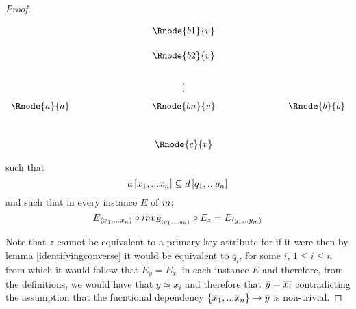 \begin{proof}
\setlength{\arraycolsep}{.2cm}
\begin{center}
$
\begin{array}{cp{2cm}ccp{2cm}c}
             & &         & \Rnode{b1}{v} &&              \\ [0.5cm]
						 & &         & \Rnode{b2}{v} &&              \\ [0.6cm]
						 & &         &    \vdots     &&              \\ [0.2cm]
\Rnode{a}{a} & &         & \Rnode{bn}{v} && \Rnode{b}{b} \\ [1.0cm]
             & &         & \Rnode{c}{v}  &&              \\
\end{array}
$
\end{center}
such that
\begin{equation}
\label{inclusiondependency}
a\left[x_1,...x_n\right]\subseteq d\left[q_1,...q_n\right]
\end{equation}
and such that in every instance $E$ of ${m}$:
\begin{equation}
\label{representationByIdentifyingRelationships}
E_{\langle x_1,...x_n \rangle}\circ inv_{E_{\langle q_1,...q_n\rangle}} \circ E_{z} = E_{\langle y_1,..y_m \rangle} 
\end{equation}

Note that $z$ cannot be equivalent to a primary key attribute for if it were then by lemma \ref{identifyingconverse}
it would be equivalent to $q_i$,
for some $i$, $1 \leq i \leq n$ from which it would follow that $E_y=E_{x_i}$ in each instance $E$ and therefore, from the definitions, 
we would have that $y \simeq x_i$ and therefore that $\overline{y}=\overline{x_i}$ contradicting the assumption that
the fucntional dependency $\left\{\overline{x}_1,...\overline{x}_n\right\} \rightarrow \overline{y}$ is non-trivial.



\end{proof}

